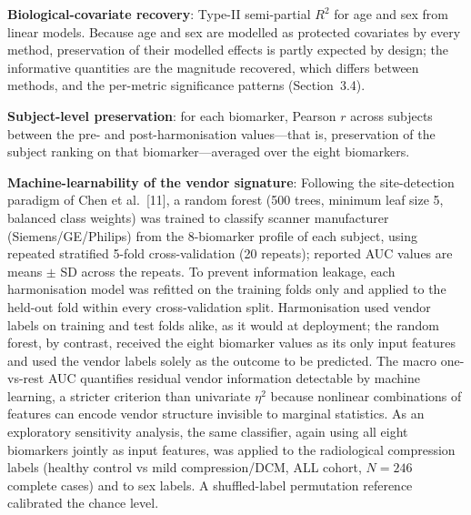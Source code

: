 \documentclass[12pt,a4paper]{article}
\begin{document}
\textbf{Biological-covariate recovery}: Type-II semi-partial $R^2$ for age and sex from linear models. Because age and sex are modelled as protected covariates by every method, preservation of their modelled effects is partly expected by design; the informative quantities are the magnitude recovered, which differs between methods, and the per-metric significance patterns (Section~3.4).

\textbf{Subject-level preservation}: for each biomarker, Pearson $r$ across subjects between the pre- and post-harmonisation values---that is, preservation of the subject ranking on that biomarker---averaged over the eight biomarkers.

\textbf{Machine-learnability of the vendor signature}: Following the site-detection paradigm of Chen et al.\ [11], a random forest (500 trees, minimum leaf size 5, balanced class weights) was trained to classify scanner manufacturer (Siemens/GE/Philips) from the 8-biomarker profile of each subject, using repeated stratified 5-fold cross-validation (20 repeats); reported AUC values are means $\pm$ SD across the repeats. To prevent information leakage, each harmonisation model was refitted on the training folds only and applied to the held-out fold within every cross-validation split. Harmonisation used vendor labels on training and test folds alike, as it would at deployment; the random forest, by contrast, received the eight biomarker values as its only input features and used the vendor labels solely as the outcome to be predicted. The macro one-vs-rest AUC quantifies residual vendor information detectable by machine learning, a stricter criterion than univariate $\eta^2$ because nonlinear combinations of features can encode vendor structure invisible to marginal statistics. As an exploratory sensitivity analysis, the same classifier, again using all eight biomarkers jointly as input features, was applied to the radiological compression labels (healthy control vs mild compression/DCM, ALL cohort, $N=246$ complete cases) and to sex labels. A shuffled-label permutation reference calibrated the chance level.
\end{document}
